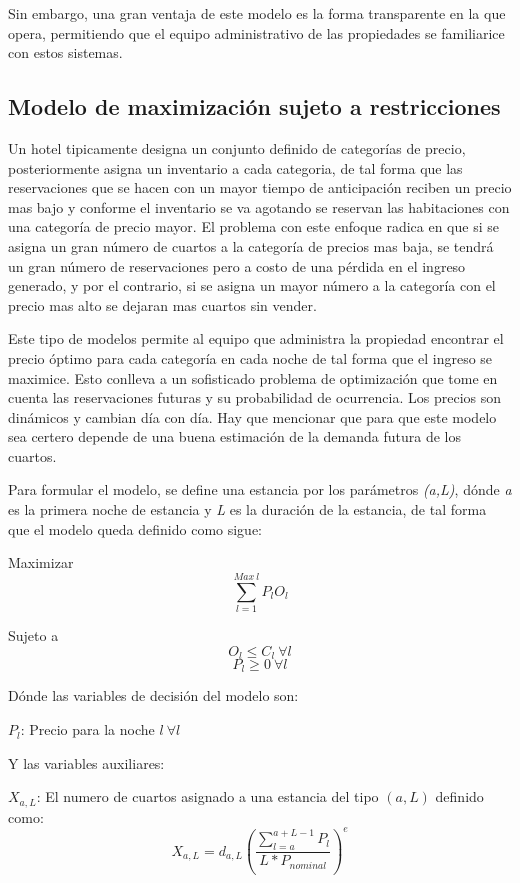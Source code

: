 {Sin embargo, una gran ventaja de este modelo es la forma transparente en la que opera, permitiendo que el equipo administrativo de las propiedades se familiarice con estos sistemas.



\subsection*{Modelo de maximización sujeto a restricciones}

Un hotel tipicamente designa un conjunto definido de categorías de precio, posteriormente asigna un inventario a cada categoria, de tal forma que las reservaciones que se hacen con un mayor tiempo de anticipación reciben un precio mas bajo y conforme el inventario se va agotando se reservan las habitaciones con una categoría de precio mayor. El problema con este enfoque radica en que si se asigna un gran número de cuartos a la categoría de precios mas baja, se tendrá un gran número de reservaciones pero a costo de una pérdida en el ingreso generado, y por el contrario, si se asigna un mayor número a la categoría con el precio mas alto se dejaran mas cuartos sin vender.

Este tipo de modelos permite al equipo que administra la propiedad encontrar el precio óptimo para cada categoría en cada noche de tal forma que el ingreso se maximice. Esto conlleva a un sofisticado problema de optimización que tome en cuenta las reservaciones futuras y su probabilidad de ocurrencia. Los precios son dinámicos y cambian día con día. Hay que mencionar que para que este modelo sea certero depende de una buena estimación de la demanda futura de los cuartos.

Para formular el modelo, se define una estancia por los parámetros \emph{(a,L)}, dónde \emph{a} es la primera noche de estancia y \emph{L} es la duración de la estancia, de tal forma que el modelo queda definido como sigue:

Maximizar $$\sum_{l=1}^{Max\ l} P_l O_l$$

Sujeto a $$O_l \leq C_l\  \forall l$$ $$P_l \geq 0 \ \forall l$$

Dónde las variables de decisión del modelo son:

$P_l$: Precio para la noche $l\ \forall l$

Y las variables auxiliares:

$X_{a,L}$: El numero de cuartos asignado a una estancia del tipo $(a,L)$ definido como: $$X_{a,L} = d_{a,L}(\frac{\sum_{l=a}^{a+L-1} P_l}{L*P_{nominal}})^e$$

}
